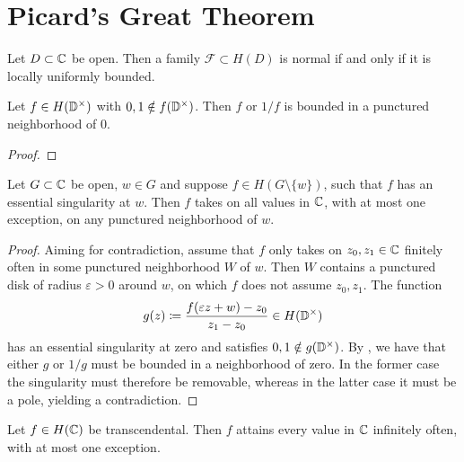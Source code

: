\section{Picard's Great Theorem}
\label{sec:picards-great-theorem}

\begin{theorem}[Montel]
    Let $D \subset \mathbb{C}$ be open. Then a family $\mathscr{F} \subset H(D)$ is normal if and only if it is locally uniformly bounded.
\end{theorem}

\begin{lemma} \label{lem:great-picard-bounded}
    Let $f \in H(\mathbb{D}^\times)$ with $0, 1 \notin f(\mathbb{D}^\times)$. Then $f$ or $1/f$ is bounded in a punctured neighborhood of $0$.
\end{lemma}

\begin{proof}
\end{proof}

\begin{theorem} \label{thm:picards-great-theorem}
    Let $G \subset \mathbb{C}$ be open, $w \in G$ and suppose $f \in H(G \setminus \{ w \})$, such that $f$ has an essential singularity at $w$. Then $f$ takes on all values in $\mathbb{C}$, with at most one exception, on any punctured neighborhood of $w$.
\end{theorem}

\begin{proof}
    Aiming for contradiction, assume that $f$ only takes on $z_0, z_1 \in \mathbb{C}$ finitely often in some punctured neighborhood $W$ of $w$. Then $W$ contains a punctured disk of radius $\varepsilon > 0$ around $w$, on which $f$ does not assume $z_0, z_1$. The function
    $$ g(z) \coloneqq \frac{f(\varepsilon z + w) - z_0}{z_1 - z_0} \in H(\mathbb{D}^\times) $$
    has an essential singularity at zero and satisfies $0, 1 \notin g(\mathbb{D}^\times)$. By , we have that either $g$ or $1/g$ must be bounded in a neighborhood of zero. In the former case the singularity must therefore be removable, whereas in the latter case it must be a pole, yielding a contradiction.
\end{proof}

\begin{corollary} \label{cor:transcendental-every-value-inf}
    Let $f \in H(\mathbb{C})$ be transcendental. Then $f$ attains every value in $\mathbb{C}$ infinitely often, with at most one exception.
\end{corollary}

